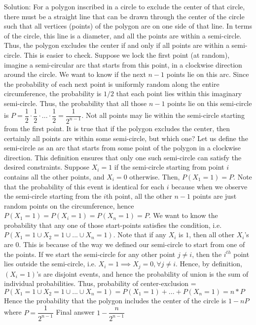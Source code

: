 \begin{enumerate}
Solution: For a polygon inscribed in a circle to exclude the center of that circle, there must be a straight line that can be drawn through the center of the circle such that all vertices (points) of the polygon are on one side of that line. In terms of the circle, this line is a diameter, and all the points are within a semi-circle. Thus, the polygon excludes the center if and only if all points are within a semi-circle. This is easier to check.
Suppose we lock the first point (at random), imagine a semi-circular arc that starts from this point, in a clockwise direction around the circle. We want to know if the next $n-1$ points lie on this arc. Since the probability of each next point is uniformly random along the entire circumference, the probability is $1/2$ that each point lies within this imaginary semi-circle. Thus, the probability that all those $n-1$ points lie on this semi-circle is $P = \dfrac{1}{2} \cdot \dfrac{1}{2}    \cdot ... \cdot \dfrac{1}{2} =\dfrac1{2^{n-1}}$.
Not all points may lie within the semi-circle starting from the first point. It is true that if the polygon excludes the center, then certainly all points are within some semi-circle, but which one? Let us define the semi-circle as an arc that starts from some point of the polygon in a clockwise direction. This definition ensures that only one such semi-circle can satisfy the desired constraints. Suppose $X_i = 1$ if the semi-circle starting from point $i$ contains all the other points, and $X_i = 0$ otherwise. Then, $P(X_1 = 1) = P$.
Note that the probability of this event is identical for each $i$ because when we observe the semi-circle starting from the $i$th point, all the other $n-1$ points are just random points on the circumference, hence $P(X_1 = 1) = P(X_i = 1) = P(X_n = 1) = P$.
We want to know the probability that any one of those start-points satisfies the condition, i.e. $P(X_1 = 1 \cup X_2 = 1 \cup ... \cup X_n = 1)$.
Note that if any $X_i$ is $1$, then all other $X_i$'s are $0$. This is because of the way we defined our semi-circle to start from one of the points. If we start the semi-circle for any other point $j \ne i$, then the $i^{th}$ point lies outside the semi-circle, i.e. $X_{i}=1 \implies X_{j} = 0, \forall j \ne i$. Hence, by definition, $(X_i = 1)$'s are disjoint events, and hence the probability of union is the sum of individual probabilities.
Thus, probability of center-exclusion = $P(X_1 = 1 \cup X_2 = 1 \cup ... \cup X_n = 1) = P(X_1 = 1) + ... + P(X_n = 1) = n * P$
Hence the probability that the polygon includes the center of the circle is $1 - nP$ where $P = \dfrac{1}{2^{n-1}}$
Final answer $1-\dfrac{n}{2^{n-1}}$




\end{enumerate}
